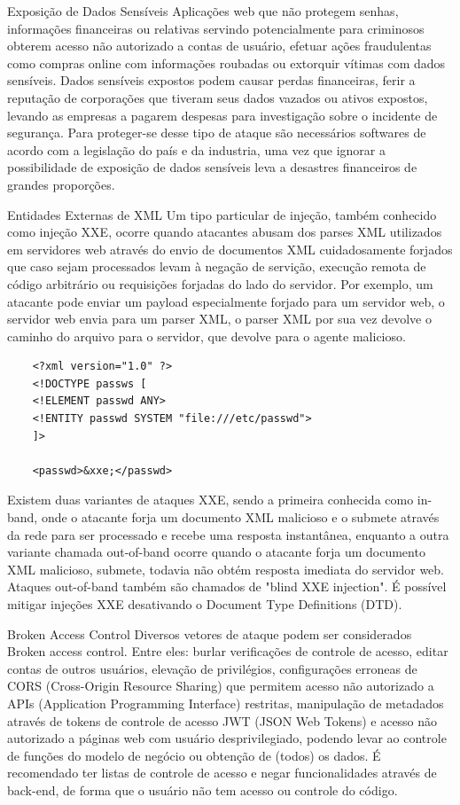 Exposição de Dados Sensíveis
Aplicações web que não protegem senhas, informações financeiras ou relativas servindo potencialmente para criminosos obterem acesso não autorizado a contas de usuário, efetuar ações fraudulentas como compras online com informações roubadas ou extorquir vítimas com dados sensíveis. Dados sensíveis expostos podem causar perdas financeiras, ferir a reputação de corporações que tiveram seus dados vazados ou ativos expostos, levando as empresas a pagarem despesas para investigação sobre o incidente de segurança. Para proteger-se desse tipo de ataque são necessários softwares de acordo com a legislação do país e da industria, uma vez que ignorar a possibilidade de exposição de dados sensíveis leva a desastres financeiros de grandes proporções. 

Entidades Externas de XML
Um tipo particular de injeção, também conhecido como injeção XXE, ocorre quando atacantes abusam dos parses XML utilizados em servidores web através do envio de documentos XML cuidadosamente forjados que caso sejam processados levam à negação de servição, execução remota de código arbitrário ou requisições forjadas do lado do servidor.
Por exemplo, um atacante pode enviar um payload especialmente forjado para um servidor web, o servidor web envia para um parser XML, o parser XML por sua vez devolve o caminho do arquivo para o servidor, que devolve para o agente malicioso.

\begin{verbatim}
    <?xml version="1.0" ?>
    <!DOCTYPE passws [
    <!ELEMENT passwd ANY>
    <!ENTITY passwd SYSTEM "file:///etc/passwd">
    ]>

    <passwd>&xxe;</passwd>
\end{verbatim}

Existem duas variantes de ataques XXE, sendo a primeira conhecida como in-band, onde o atacante forja um documento XML malicioso e o submete através da rede para ser processado e recebe uma resposta instantânea, enquanto a outra variante chamada out-of-band ocorre quando o atacante forja um documento XML malicioso, submete, todavia não obtém resposta imediata do servidor web. Ataques out-of-band também são chamados de "blind XXE injection".
É possível mitigar injeções XXE desativando o Document Type Definitions (DTD). 

Broken Access Control
Diversos vetores de ataque podem ser considerados Broken access control. Entre eles: burlar verificações de controle de acesso, editar contas de outros usuários, elevação de privilégios, configurações erroneas de CORS (Cross-Origin Resource Sharing) que permitem acesso não autorizado a APIs (Application Programming Interface) restritas, manipulação de metadados através de tokens de controle de acesso JWT (JSON Web Tokens) e acesso não autorizado a páginas web com usuário desprivilegiado, podendo levar ao controle de funções do modelo de negócio ou obtenção de (todos) os dados.
É recomendado ter listas de controle de acesso e negar funcionalidades através de back-end, de forma que o usuário não tem acesso ou controle do código.

